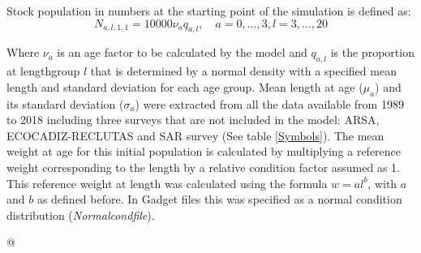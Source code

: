 \documentclass[review]{elsarticle}
\begin{document}
Stock population in numbers at the starting point of the simulation is defined as:
$$N_{a,l,1,1}=10000\nu_{a}q_{a,l}, \quad a=0,\dots,3, l=3,\dots,20$$

Where $\nu_{a}$ is an age factor to be calculated by the model and $q_{a,l}$ is the proportion at lengthgroup $l$ that is determined by a normal density with a specified mean length and standard deviation for each age group. Mean length at age ($\mu_{a}$) and its standard deviation ($\sigma_{a}$) were extracted from all the data available from 1989 to 2018 including three surveys that are not included in the model: ARSA, ECOCADIZ-RECLUTAS and SAR survey (See table \ref{Symbols}). The mean weight at age for this initial population is calculated by multiplying a reference weight corresponding to the length by a relative condition factor assumed as 1. This reference weight at length was calculated using the formula $w=al^{b}$, with $a$ and $b$ as defined before. In Gadget files this was specified as a normal condition distribution (\textit{Normalcondfile}).

 @
\end{document}
